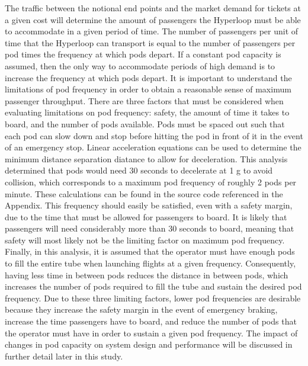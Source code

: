 The traffic between the notional end points and the market demand for tickets
at a given cost will determine the amount of passengers the Hyperloop must be
able to accommodate in a given period of time. The number of passengers per
unit of time that the Hyperloop can transport is equal to the number of
passengers per pod times the frequency at which pods depart. If a constant pod
capacity is assumed, then the only way to accommodate periods of high
demand is to increase the frequency at which pods depart. It is important to
understand the limitations of pod frequency in order to obtain a reasonable
sense of maximum passenger throughput. There are three factors that must be
considered when evaluating limitations on pod frequency: safety, the amount of
time it takes to board, and the number of pods available. Pods must be spaced
out such that each pod can slow down and stop before hitting the pod in front
of it in the event of an emergency stop. Linear acceleration equations can be
used to determine the minimum distance separation diatance to allow for deceleration.
This analysis determined that pods would need 30 seconds to decelerate at 1 g
to avoid collision, which corresponds to a maximum pod frequency of
roughly 2 pods per minute. These calculations can be found in the source code referenced
in the Appendix. This frequency should easily be satisfied, even
with a safety margin, due to the time that must be allowed for passengers to
board. It is likely that passengers will need considerably more than 30
seconds to board, meaning that safety will most likely not be the limiting factor on
maximum pod frequency. Finally, in this analysis, it is assumed that the
operator must have enough pods to fill the entire tube when launching flights
at a given frequency. Consequently, having less time in between pods reduces
the distance in between pods, which increases the number of pods required to
fill the tube and sustain the desired pod frequency. Due to these three
limiting factors, lower pod frequencies are desirable because they increase
the safety margin in the event of emergency braking, increase the time
passengers have to board, and reduce the number of pods that the operator must
have in order to sustain a given pod frequency. The impact of changes in pod
capacity on system design and performance will be discussed in further detail
later in this study.
